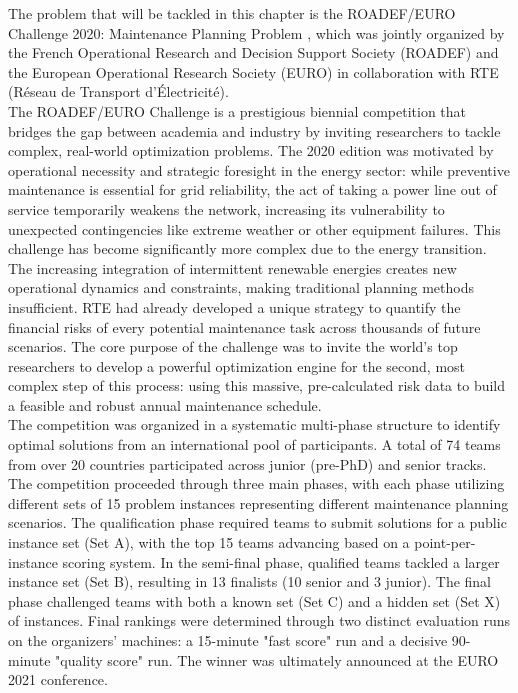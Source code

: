 The problem that will be tackled in this chapter is the ROADEF/EURO Challenge 2020: Maintenance Planning Problem \cite{roadef2020}, which was jointly organized by the French Operational Research and Decision Support Society (ROADEF) and the European Operational Research Society (EURO) in collaboration with RTE (Réseau de Transport d'Électricité).\\

The ROADEF/EURO Challenge is a prestigious biennial competition that bridges the gap between academia and industry by inviting researchers to tackle complex, real-world optimization problems. The 2020 edition was motivated by operational necessity and strategic foresight in the energy sector: while preventive maintenance is essential for grid reliability, the act of taking a power line out of service temporarily weakens the network, increasing its vulnerability to unexpected contingencies like extreme weather or other equipment failures. This challenge has become significantly more complex due to the energy transition. The increasing integration of intermittent renewable energies creates new operational dynamics and constraints, making traditional planning methods insufficient. RTE had already developed a unique strategy to quantify the financial risks of every potential maintenance task across thousands of future scenarios. The core purpose of the challenge was to invite the world's top researchers to develop a powerful optimization engine for the second, most complex step of this process: using this massive, pre-calculated risk data to build a feasible and robust annual maintenance schedule.\\

The competition was organized in a systematic multi-phase structure to identify optimal solutions from an international pool of participants. A total of 74 teams from over 20 countries participated across junior (pre-PhD) and senior tracks. The competition proceeded through three main phases, with each phase utilizing different sets of 15 problem instances representing different maintenance planning scenarios. The qualification phase required teams to submit solutions for a public instance set (Set A), with the top 15 teams advancing based on a point-per-instance scoring system. In the semi-final phase, qualified teams tackled a larger instance set (Set B), resulting in 13 finalists (10 senior and 3 junior). The final phase challenged teams with both a known set (Set C) and a hidden set (Set X) of instances. Final rankings were determined through two distinct evaluation runs on the organizers' machines: a 15-minute "fast score" run and a decisive 90-minute "quality score" run. The winner was ultimately announced at the EURO 2021 conference. \\


